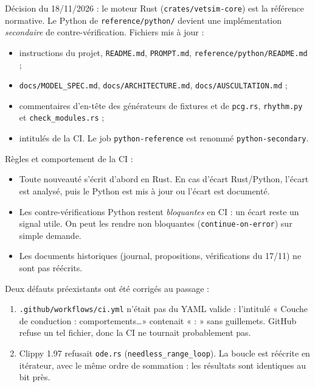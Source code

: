 \documentclass[10pt,a4paper]{article}
\newcommand{\cmd}[1]{\texttt{#1}}
\begin{document}
Décision du 18/11/2026 : le moteur Rust (\cmd{crates/vetsim-core}) est la référence normative. Le Python de \cmd{reference/python/} devient une implémentation \emph{secondaire} de contre-vérification. Fichiers mis à jour :
\begin{itemize}
\item instructions du projet, \cmd{README.md}, \cmd{PROMPT.md}, \cmd{reference/python/README.md} ;
\item \cmd{docs/MODEL\_SPEC.md}, \cmd{docs/ARCHITECTURE.md}, \cmd{docs/AUSCULTATION.md} ;
\item commentaires d'en-tête des générateurs de fixtures et de \cmd{pcg.rs}, \cmd{rhythm.py} et \cmd{check\_modules.rs} ;
\item intitulés de la CI. Le job \cmd{python-reference} est renommé \cmd{python-secondary}.
\end{itemize}

Règles et comportement de la CI :
\begin{itemize}
\item Toute nouveauté s'écrit d'abord en Rust. En cas d'écart Rust/Python, l'écart est analysé, puis le Python est mis à jour ou l'écart est documenté.
\item Les contre-vérifications Python restent \emph{bloquantes} en CI : un écart reste un signal utile. On peut les rendre non bloquantes (\cmd{continue-on-error}) sur simple demande.
\item Les documents historiques (journal, propositions, vérifications du 17/11) ne sont pas réécrits.
\end{itemize}

Deux défauts préexistants ont été corrigés au passage :
\begin{enumerate}
\item \cmd{.github/workflows/ci.yml} n'était pas du YAML valide : l'intitulé « Couche de conduction : comportements\ldots » contenait « : » sans guillemets. GitHub refuse un tel fichier, donc la CI ne tournait probablement pas.
\item Clippy 1.97 refusait \cmd{ode.rs} (\cmd{needless\_range\_loop}). La boucle est réécrite en itérateur, avec le même ordre de sommation : les résultats sont identiques au bit près.
\end{enumerate}
\end{document}
